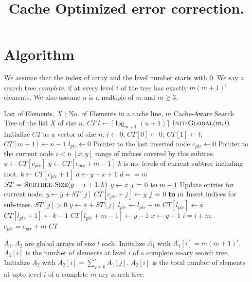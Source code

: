 \documentclass[integrals, nointegrals, article, 12pt, a4paper]{article}
\date{}
\title{Cache Optimized error correction.}
\begin{document}
\maketitle

\section{Algorithm}
\label{sec-1}
We assume that the index of array and the level number starts with
$0$.  We say a search tree \emph{complete}, if at every level $i$ of the
tree has exactly $m(m+1)^{i}$ elements. We also assume $n$ is a
multiple of $m$ and $m \geq 3$.

\begin{codebox}
\zi {} List of Elements, $X$ ; No. of Elements in a cache line, $m$
\zi {} Cache-Aware Search Tree of the list $X$ of size $n$, $CT$
\li $l \gets \lceil \log_{m+1} (n+1) \rceil$
\li $\textnormal{\scshape Init-Global}(m, l)$
\li Initialize $CT$ as a vector of size $n$.
\li $i \gets 0$; $CT[0] \gets 0$; $CT[1] \gets l$; $CT[m - 1] \gets n - 1$
\li $l_{ptr} \gets 0$ \Comment Pointer to the last inserted node
\li $c_{ptr} \gets 0$ \Comment Pointer to the current node
\li \While $i < n$
    \Do
\zi      \Comment $[x,y]$ range of indices covered by this subtree.
\li      $x \gets CT[c_{ptr}]$
\li      $y \gets CT[c_{ptr} + m - 1]$
\zi      \Comment $k$ is no. levels of current subtree including root.
\li      $k \gets CT[c_{ptr} + 1]$
\li      $d \gets y - x + 1$
\li      \If $d == m$
         \Then
\li
\li      $ST \mathrel{\hspace{1pt}=\hspace{1pt}} \textnormal{\scshape Subtree-Size}(y - x + 1, k)$
\li      $y \gets x$
\li      \For $j \gets 0 \To m - 1$ \Comment Update entries for current node.
         \Do
\li           $y \gets y + ST[j]$
\li           $CT[c_{ptr} + j] \gets y$
         \End
\li      \For $j \gets 0 \To m$ \Comment Insert indices for sub-trees.
         \Do
\li           \If $ST[j] > 0$
              \Do
\li               $y \gets x + ST[j]$
\li               $l_{ptr} \gets l_{ptr} + m$
\li               $CT[l_{ptr}] \gets x$
\li               $CT[l_{ptr} + 1] \gets k - 1$
\li               $CT[l_{ptr} + m - 1] \gets y - 1$
\li               $x \gets y + 1$
              \End
        \End
\li     $i = i + m$; $c_{ptr} = c_{ptr} + m$
    \End
\li \Return $CT$
\end{codebox}

\begin{codebox}
\zi $A_1, A_2$ are global arrays of size $l$ each.
\li Initialize $A_1$ with $A_1[i] = m(m+1)^{i}$.
\zi \quad $A_1[i]$ is the number of elements at level $i$ of a
    complete $m$-ary search tree.
\li Initialize $A_2$ with $A_2[i] = \sum_{j = 0}^i A_1[j]$.
\zi \quad $A_2[i]$ is the total number of elements at upto
    level $i$ of a complete $m$-ary search tree.
\end{codebox}
\end{document}
